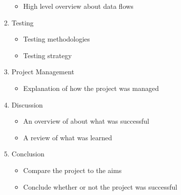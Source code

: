 \begin{enumerate}
\begin{itemize}
            \item High level overview about data flows
        \end{itemize}
    \item Testing
        \begin{itemize}
            \item Testing methodologies
            \item Testing strategy
        \end{itemize}
    \item Project Management
        \begin{itemize}
            \item Explanation of how the project was managed
        \end{itemize}
    \item Discussion
        \begin{itemize}
            \item An overview of about what was successful
            \item A review of what was learned
        \end{itemize}
    \item Conclusion
        \begin{itemize}
            \item Compare the project to the aims
            \item Conclude whether or not the project was successful
        \end{itemize}
\end{enumerate}


